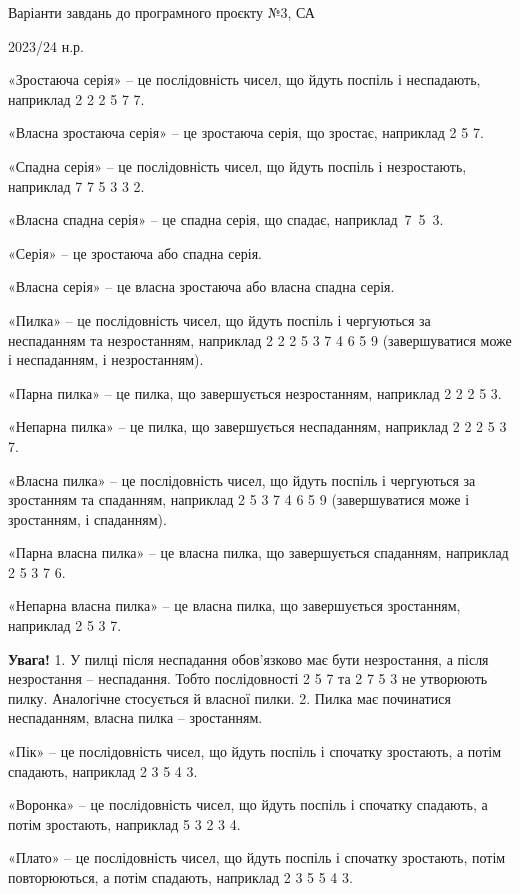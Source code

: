 \documentclass[12pt, ukrainian]{article}
\begin{document}
{\Large \center  Варіанти завдань до програмного проєкту №3, СА\par 2023/24 н.р.\par \bigskip\bigskip}

«Зростаюча серія» – це послідовність чисел, що йдуть поспіль і неспадають, наприклад 2 2 2 5 7 7.

«Власна зростаюча серія» – це зростаюча серія, що зростає, наприклад 2  5  7.

«Спадна серія» – це послідовність чисел, що йдуть поспіль і незростають, наприклад 7 7 5 3 3 2.

«Власна спадна серія» – це спадна серія, що спадає, наприклад~7~5~3.

«Серія» – це зростаюча або спадна серія.

«Власна серія» – це власна зростаюча або власна спадна серія.

«Пилка» – це послідовність чисел, що йдуть поспіль і чергуються за неспаданням та незростанням, наприклад 2 2 2 5 3 7 4 6 5 9 (завершуватися може і неспаданням, і незростанням).

«Парна пилка» – це пилка, що завершується незростанням, наприклад 2 2 2 5 3.

«Непарна пилка» – це пилка, що завершується неспаданням, наприклад 2 2 2 5 3 7.

«Власна пилка» – це послідовність чисел, що йдуть поспіль і чергуються за зростанням та спаданням, наприклад 2 5 3 7 4 6 5 9 (завершуватися може і зростанням, і спаданням).

«Парна власна пилка» – це власна пилка, що завершується спаданням, наприклад 2 5 3 7 6.

«Непарна власна пилка» – це власна пилка, що завершується зростанням, наприклад 2 5 3 7.

\textbf{Увага!} 1. У пилці після неспадання обов’язково має бути незростання, а після незростання  – неспадання. Тобто послідовності 2 5 7 та 2 7 5 3 не утворюють пилку. Аналогічне стосується й власної пилки. 2. Пилка має починатися неспаданням, власна пилка – зростанням.

«Пік» – це послідовність чисел, що йдуть поспіль і спочатку зростають, а потім спадають, наприклад 2 3 5 4 3. 

«Воронка» – це послідовність чисел, що йдуть поспіль і спочатку спадають, а потім зростають, наприклад 5 3 2 3 4.

«Плато» – це послідовність чисел, що йдуть поспіль і спочатку зростають, потім повторюються, а потім спадають, наприклад 2 3 5 5 4 3.
\end{document}
